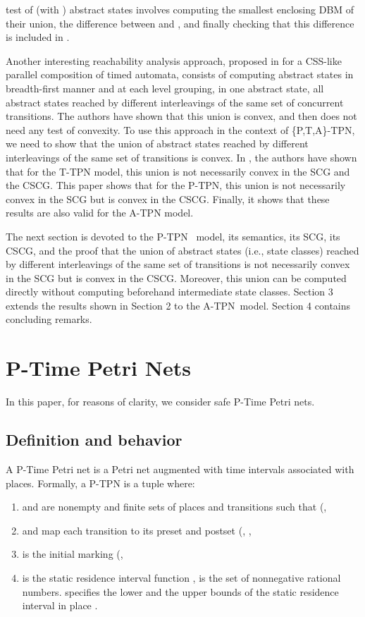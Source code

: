 \documentclass[submission,copyright,creativecommons]{eptcs}
\numberwithin{equation}{section}
\def\tapn{A-TPN}
\def\tppn{P-TPN}
\def\ttappn{\{P,T,A\}-TPN}
\begin{document}
test of  (with ) abstract states  involves computing the smallest enclosing DBM  of their union, the
difference between  and ,
and finally checking that this difference is included in .
\par Another interesting reachability analysis approach, proposed in \cite{Maler06} for a CSS-like parallel composition of timed automata, consists of computing abstract states in breadth-first manner and at each level grouping, in one abstract state, all abstract states reached by different interleavings of the same set of concurrent transitions. The authors have shown that this union is convex, and then does not need any test of convexity. To use this approach in the context of \ttappn, we need to show that the union of abstract states reached by different interleavings of the same set of transitions is convex. In \cite{infinity08}, the authors have shown that for the T-TPN model, this union is not necessarily convex in the SCG and the CSCG. This paper shows that for the \tppn, this union is not necessarily convex in the SCG but is convex in the CSCG. Finally, it shows that these results are also valid for the A-TPN model.
\par The next section is devoted to the \tppn~
model, its semantics, its SCG, its CSCG, and the proof that the union of abstract states (i.e., state classes) reached by different interleavings of the same set of transitions is not necessarily convex in the SCG but is convex in the CSCG. Moreover, this union can be computed directly without computing beforehand intermediate state classes. Section 3 extends the results shown in Section 2 to the \tapn~model. Section 4 contains concluding remarks.

\section{P-Time Petri Nets}
In this paper, for reasons of clarity, we consider safe P-Time Petri nets.

\subsection{Definition and behavior} \label{semantics}
A P-Time Petri net is a Petri net augmented with time intervals
associated with places. Formally, a P-TPN is a tuple  where: \begin{enumerate} \item  and  are nonempty and finite sets of places and transitions such that (, \item  and  map each transition to its preset and postset (,  ,
\item  is the initial marking (, \item  is the static
residence interval function ,  is the set of nonnegative rational
numbers.  specifies the lower 
and the upper  bounds of the static residence
interval in place . \end{enumerate}
\end{document}
